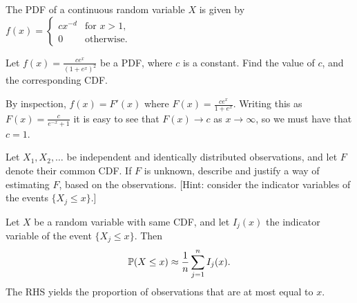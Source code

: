 \begin{exercise}
\begin{questions}
\question
The PDF of a continuous random variable $X$ is given by
$
f(x) = \begin{cases}
	cx^{-d}	& \text{for } x > 1, \\
	0		& \text{otherwise.}
\end{cases}
$

\question
Let $\displaystyle f(x) = \frac{ce^x}{(1+e^x)^2}$ be a PDF, where $c$ is a constant. Find the value of $c$, and the corresponding CDF.
\begin{answer}
By inspection, $f(x) = F'(x)$ where $F(x) = \frac{ce^x}{1+e^x}$. Writing this as $F(x) = \frac{c}{e^{-x}+1}$ it is easy to see that $F(x)\to c$ as $x\to\infty$, so we must have that $c=1$.
\end{answer}

\question
Let $X_1,X_2,\ldots$ be independent and identically distributed observations, and let $F$ denote their common CDF. If $F$ is unknown, describe and justify a way of estimating $F$, based on the observations. [Hint: consider the indicator variables of the events $\{X_j\leq x\}$.]
\begin{answer}
Let $X$ be a random variable with same CDF, and let $I_j(x)$ the indicator variable of the event $\{X_j\leq x\}$. Then
\[
\mathbb{P}(X\leq x) \approx \frac{1}{n}\sum_{j=1}^{n} I_j(x).
\]
The RHS yields the proportion of observations that are at most equal to $x$.
\end{answer}

\end{questions}
\end{exercise}

\endinput
